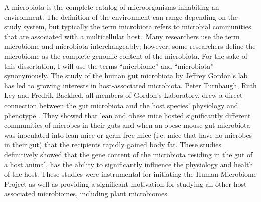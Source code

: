 A microbiota is the complete catalog of microorganisms inhabiting an environment. The definition of the environment can range depending on the study system, but typically the term microbiota refers to microbial communities that are associated with a multicellular host. Many researchers use the term microbiome and microbiota interchangeably; however, some researchers define the microbiome as the complete genomic content of the microbiota. For the sake of this dissertation, I will use the terms ``micrbiome'' and ``microbiota'' synonymously. The study of the human gut microbiota by Jeffrey Gordon's lab has led to growing interests in host-associated microbiota. Peter Turnbaugh, Ruth Ley and Fredrik Backhed, all members of Gordon's Laboratory, drew a direct connection between the gut microbiota and the host species' physiology and phenotype \cite{Turnbaugh,Backhed,Ley2005}. They showed that lean and obese mice hosted significantly different communities of microbes in their guts and when an obese mouse gut microbiota was inoculated into lean mice or germ free mice (i.e. mice that have no microbes in their gut) that the recipients rapidly gained body fat. These studies definitively showed that the gene content of the microbiota residing in the gut of a host animal, has the ability to significantly influence the physiology and health of the host. These studies were instrumental for initiating the Human Microbiome Project \cite{Turnbaugh2007} as well as providing a significant motivation for studying all other host-associated microbiomes, including plant microbiomes.

